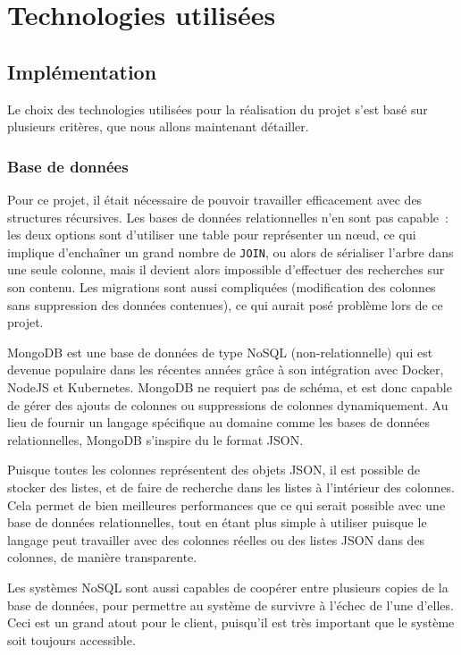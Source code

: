 \section{Technologies utilisées}\label{sec:technologies-utilisees}

\subsection{Implémentation}\label{subsec:livrables-et-developpement}

Le choix des technologies utilisées pour la réalisation du projet s'est basé sur plusieurs critères, que nous allons maintenant détailler.

\subsubsection{Base de données}

Pour ce projet, il était nécessaire de pouvoir travailler efficacement avec des structures récursives.
Les bases de données relationnelles n'en sont pas capable~: les deux options sont d'utiliser une table pour représenter un nœud, ce qui implique d'enchaîner un grand nombre de \lstinline{JOIN}, ou alors de sérialiser l'arbre dans une seule colonne, mais il devient alors impossible d'effectuer des recherches sur son contenu.
Les migrations sont aussi compliquées (modification des colonnes sans suppression des données contenues), ce qui aurait posé problème lors de ce projet.

\uparagraph
MongoDB est une base de données de type NoSQL (non-relationnelle) qui est devenue populaire dans les récentes années grâce à son intégration avec Docker, NodeJS et Kubernetes.
MongoDB ne requiert pas de schéma, et est donc capable de gérer des ajouts de colonnes ou suppressions de colonnes dynamiquement.
Au lieu de fournir un langage spécifique au domaine comme les bases de données relationnelles, MongoDB s'inspire du le format JSON\@.

Puisque toutes les colonnes représentent des objets JSON, il est possible de stocker des listes, et de faire de recherche dans les listes à l'intérieur des colonnes.
Cela permet de bien meilleures performances que ce qui serait possible avec une base de données relationnelles, tout en étant plus simple à utiliser puisque le langage peut travailler avec des colonnes réelles ou des listes JSON dans des colonnes, de manière transparente.

Les systèmes NoSQL sont aussi capables de coopérer entre plusieurs copies de la base de données, pour permettre au système de survivre à l'échec de l'une d'elles.
Ceci est un grand atout pour le client, puisqu'il est très important que le système soit toujours accessible.

